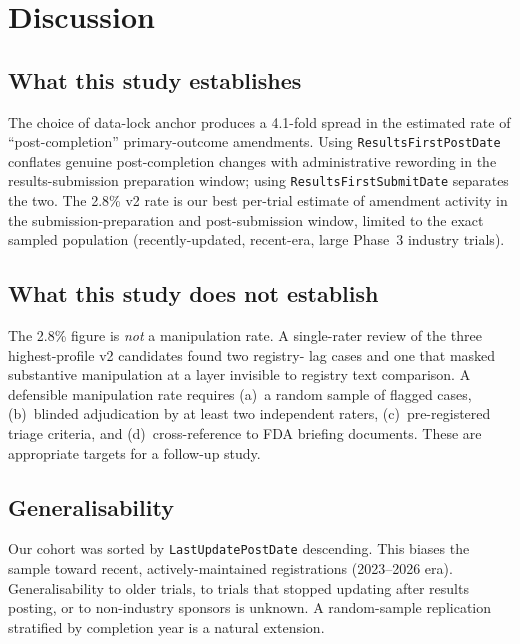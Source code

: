 \documentclass[11pt,a4paper]{article}
\begin{document}
\section{Discussion}

\subsection{What this study establishes}
The choice of data-lock anchor produces a 4.1-fold spread in the
estimated rate of ``post-completion'' primary-outcome amendments.
Using \texttt{ResultsFirstPostDate} conflates genuine post-completion
changes with administrative rewording in the results-submission
preparation window; using \texttt{ResultsFirstSubmitDate} separates
the two. The 2.8\% v2 rate is our best per-trial estimate of amendment
activity in the submission-preparation and post-submission window,
limited to the exact sampled population (recently-updated, recent-era,
large Phase~3 industry trials).

\subsection{What this study does not establish}
The 2.8\% figure is \emph{not} a manipulation rate. A single-rater
review of the three highest-profile v2 candidates found two registry-
lag cases and one that masked substantive manipulation at a layer
invisible to registry text comparison. A defensible manipulation
rate requires (a)~a random sample of flagged cases, (b)~blinded
adjudication by at least two independent raters, (c)~pre-registered
triage criteria, and (d)~cross-reference to FDA briefing documents.
These are appropriate targets for a follow-up study.

\subsection{Generalisability}
Our cohort was sorted by \texttt{LastUpdatePostDate} descending. This
biases the sample toward recent, actively-maintained registrations
(2023--2026 era). Generalisability to older trials, to trials that
stopped updating after results posting, or to non-industry sponsors
is unknown. A random-sample replication stratified by completion
year is a natural extension.
\end{document}
